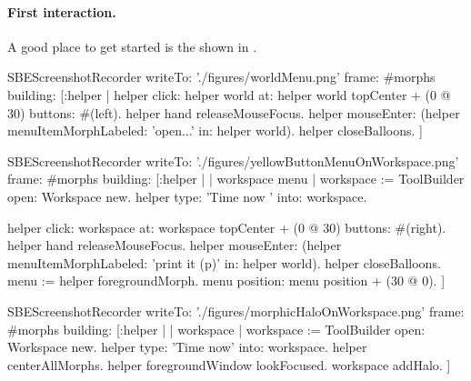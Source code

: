 \documentclass[a4paper,10pt,twoside]{book}
\begin{document}
\paragraph{First interaction.}

A good place to get started is the  shown in .

\begin{ExecuteSmalltalkScript}
SBEScreenshotRecorder writeTo: './figures/worldMenu.png' frame: #morphs building: [:helper |
	helper click: helper world at: helper world topCenter + (0 @ 30) buttons: #(left).
	helper hand releaseMouseFocus.
	helper mouseEnter: (helper menuItemMorphLabeled: 'open...' in: helper world).
	helper closeBalloons.
]
\end{ExecuteSmalltalkScript}

\begin{ExecuteSmalltalkScript}
SBEScreenshotRecorder writeTo: './figures/yellowButtonMenuOnWorkspace.png' frame: #morphs building: [:helper |
	| workspace menu |
	workspace := ToolBuilder open: Workspace new.
	helper type: 'Time now ' into: workspace.

	helper click: workspace at: workspace topCenter + (0 @ 30) buttons: #(right).
	helper hand releaseMouseFocus.
	helper mouseEnter: (helper menuItemMorphLabeled: 'print it (p)' in: helper world).
	helper closeBalloons.
	menu := helper foregroundMorph.
	menu position: menu position + (30 @ 0).
]
\end{ExecuteSmalltalkScript}

\begin{ExecuteSmalltalkScript}
SBEScreenshotRecorder writeTo: './figures/morphicHaloOnWorkspace.png' frame: #morphs building: [:helper | | workspace |
	workspace := ToolBuilder open: Workspace new.
	helper type: 'Time now' into: workspace.
	helper centerAllMorphs.
	helper foregroundWindow lookFocused.
	workspace addHalo.
]
\end{ExecuteSmalltalkScript}
\end{document}
